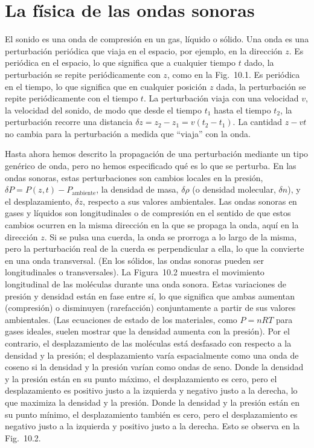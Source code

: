 \documentclass[12pt]{book}
\begin{document}
\section{La física de las ondas sonoras}

El sonido es una onda de compresión en un gas, líquido o sólido. Una onda es una perturbación periódica que viaja en el espacio, por ejemplo, en la dirección $z$. Es periódica en el espacio, lo que significa que a cualquier tiempo $t$ dado, la perturbación se repite periódicamente con $z$, como en la Fig.~10.1. Es periódica en el tiempo, lo que significa que en cualquier posición $z$ dada, la perturbación se repite periódicamente con el tiempo $t$. La perturbación viaja con una velocidad $v$, la velocidad del sonido, de modo que desde el tiempo $t_1$ hasta el tiempo $t_2$, la perturbación recorre una distancia $\delta z = z_2 - z_1 = v(t_2 - t_1)$. La cantidad $z - vt$ no cambia para la perturbación a medida que ``viaja'' con la onda.

Hasta ahora hemos descrito la propagación de una perturbación mediante un tipo genérico de onda, pero no hemos especificado qué es lo que se perturba. En las ondas sonoras, estas perturbaciones son cambios locales en la presión, $\delta P = P(z, t) - P_{\text{ambiente}}$, la densidad de masa, $\delta\rho$ (o densidad molecular, $\delta n$), y el desplazamiento, $\delta z$, respecto a sus valores ambientales. Las ondas sonoras en gases y líquidos son longitudinales o de compresión en el sentido de que estos cambios ocurren en la misma dirección en la que se propaga la onda, aquí en la dirección $z$. Si se pulsa una cuerda, la onda se prorroga a lo largo de la misma, pero la perturbación real de la cuerda es perpendicular a ella, lo que la convierte en una onda transversal. (En los sólidos, las ondas sonoras pueden ser longitudinales o transversales). La Figura~10.2 muestra el movimiento longitudinal de las moléculas durante una onda sonora. Estas variaciones de presión y densidad están en fase entre sí, lo que significa que ambas aumentan (compresión) o disminuyen (rarefacción) conjuntamente a partir de sus valores ambientales. (Las ecuaciones de estado de los materiales, como $P = nRT$ para gases ideales, suelen mostrar que la densidad aumenta con la presión). Por el contrario, el desplazamiento de las moléculas está desfasado con respecto a la densidad y la presión; el desplazamiento varía espacialmente como una onda de coseno si la densidad y la presión varían como ondas de seno. Donde la densidad y la presión están en su punto máximo, el desplazamiento es cero, pero el desplazamiento es positivo justo a la izquierda y negativo justo a la derecha, lo que maximiza la densidad y la presión. Donde la densidad y la presión están en su punto mínimo, el desplazamiento también es cero, pero el desplazamiento es negativo justo a la izquierda y positivo justo a la derecha. Esto se observa en la Fig.~10.2.
\end{document}
